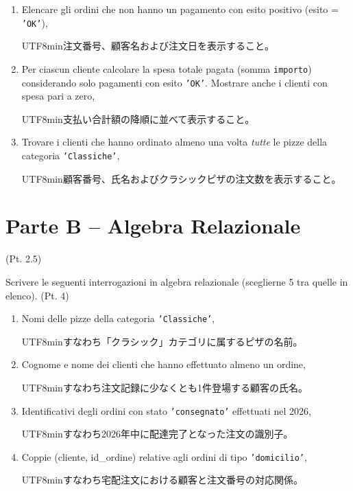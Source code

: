 \documentclass[a4paper,12pt]{article}
\begin{document}
\begin{enumerate}
		\item Elencare gli ordini che non hanno un pagamento con esito positivo (esito = \texttt{'OK'}),
		\begin{CJK}{UTF8}{min}注文番号、顧客名および注文日を表示すること。\end{CJK}
		
		\item Per ciascun cliente calcolare la spesa totale pagata (somma \texttt{importo}) considerando solo pagamenti con esito \texttt{'OK'}. Mostrare anche i clienti con spesa pari a zero,
		\begin{CJK}{UTF8}{min}支払い合計額の降順に並べて表示すること。\end{CJK}
		
		\item Trovare i clienti che hanno ordinato almeno una volta \emph{tutte} le pizze della categoria \texttt{'Classiche'},
		\begin{CJK}{UTF8}{min}顧客番号、氏名およびクラシックピザの注文数を表示すること。\end{CJK}
	\end{enumerate}
	
	\section*{Parte B -- Algebra Relazionale}  (Pt. 2.5)
	
	Scrivere le seguenti interrogazioni in algebra relazionale (sceglierne 5 tra quelle in elenco). (Pt. 4)
	
	\begin{enumerate}
		\item Nomi delle pizze della categoria \texttt{'Classiche'},
		\begin{CJK}{UTF8}{min}すなわち「クラシック」カテゴリに属するピザの名前。\end{CJK}
		
		\item Cognome e nome dei clienti che hanno effettuato almeno un ordine,
		\begin{CJK}{UTF8}{min}すなわち注文記録に少なくとも1件登場する顧客の氏名。\end{CJK}
		
		\item Identificativi degli ordini con stato \texttt{'consegnato'} effettuati nel 2026,
		\begin{CJK}{UTF8}{min}すなわち2026年中に配達完了となった注文の識別子。\end{CJK}
		
		\item Coppie (cliente, id\_ordine) relative agli ordini di tipo \texttt{'domicilio'},
		\begin{CJK}{UTF8}{min}すなわち宅配注文における顧客と注文番号の対応関係。\end{CJK}
	\end{enumerate}
	
\end{document}
